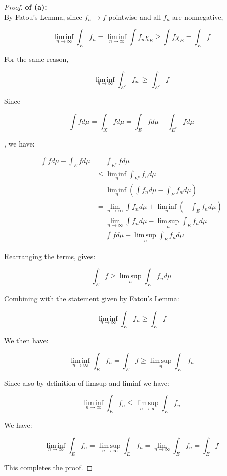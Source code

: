 \documentclass{qlnotes-export}
\begin{document}
\begin{proof}

\textbf{of (a):}\\
By Fatou's Lemma, since \(f_{n}\rightarrow f\) pointwise and all \(f_{n}\) are nonnegative,

\[\operatorname{lim\, inf}\limits_{n\rightarrow\infty}\int_{E}f_{n} = \operatorname{lim\, inf}\limits_{n\rightarrow\infty}\int f_{n}\chi_{E} \geq \int f\chi_{E} = \int_{E}f\]

For the same reason,

\[\operatorname{lim\, inf}\limits_{n\rightarrow\infty}\int_{E^{c}}f_{n}\, \geq \,\int_{E^{c}}f\]

Since

\[\int f d\mu = \int_{X}f d\mu = \int_{E}f d\mu + \int_{E^{c}}f d\mu\]

, we have:

\[\begin{matrix}
{\int f d\mu - \int_{E}f d\mu} & {= \int_{E^{c}}f d\mu} \\
 & {\leq \operatorname{lim\, inf}\limits_{n}\int_{E^{c}}f_{n} d\mu} \\
 & {= \operatorname{lim\, inf}\limits_{n}(\int f_{n} d\mu - \int_{E}f_{n} d\mu)} \\
 & {= \lim\limits_{n\rightarrow\infty}\int f_{n} d\mu + \operatorname{lim\, inf}\limits_{n}( - \int_{E}f_{n} d\mu)} \\
 & {= \lim\limits_{n\rightarrow\infty}\int f_{n} d\mu - \operatorname{lim\, sup}\limits_{n}\int_{E}f_{n} d\mu} \\
 & {= \int f d\mu - \operatorname{lim\, sup}\limits_{n}\int_{E}f_{n} d\mu}
\end{matrix}\]

Rearranging the terms, gives:

\[\int_{E}f \geq \operatorname{lim\, sup}\limits_{n}\int_{E}f_{n} d\mu\]

Combining with the statement given by Fatou's Lemma:

\[\operatorname{lim\, inf}\limits_{n\rightarrow\infty}\int_{E}f_{n} \geq \int_{E}f\]

We then have:

\[\operatorname{lim\, inf}\limits_{n\rightarrow\infty}\int_{E}f_{n} = \int_{E}f \geq \operatorname{lim\, sup}\limits_{n}\int_{E}f_{n}\]

Since also by definition of limsup and liminf we have:

\[\operatorname{lim\, inf}\limits_{n\rightarrow\infty}\int_{E}f_{n} \leq \operatorname{lim\, sup}\limits_{n\rightarrow\infty}\int_{E}f_{n}\]

We have:

\[\operatorname{lim\, inf}\limits_{n\rightarrow\infty}\int_{E}f_{n} = \operatorname{lim\, sup}\limits_{n\rightarrow\infty}\int_{E}f_{n} = \lim\limits_{n\rightarrow\infty}\int_{E}f_{n} = \int_{E}f\]

This completes the proof.

\end{proof}
\end{document}
